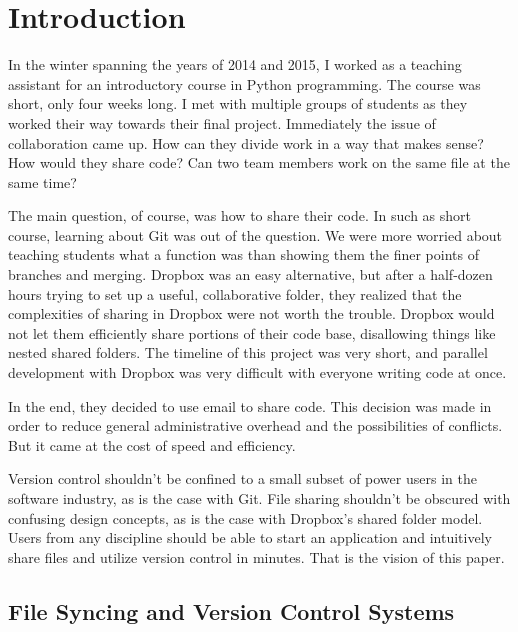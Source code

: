 \chapter{Introduction}

In the winter spanning the years of 2014 and 2015, I worked as a teaching assistant for an introductory course in Python programming. The course was short, only four weeks long. I met with multiple groups of students as they worked their way towards their final project. Immediately the issue of collaboration came up. How can they divide work in a way that makes sense? How would they share code? Can two team members work on the same file at the same time?

The main question, of course, was how to share their code. In such as short course, learning about Git was out of the question. We were more worried about teaching students what a function was than showing them the finer points of branches and merging. Dropbox was an easy alternative, but after a half-dozen hours trying to set up a useful, collaborative folder, they realized that the complexities of sharing in Dropbox were not worth the trouble. Dropbox would not let them efficiently share portions of their code base, disallowing things like nested shared folders. The timeline of this project was very short, and parallel development with Dropbox was very difficult with everyone writing code at once. 

In the end, they decided to use email to share code. This decision was made in order to reduce general administrative overhead and the possibilities of conflicts. But it came at the cost of speed and efficiency.

Version control shouldn't be confined to a small subset of power users in the software industry, as is the case with Git. File sharing shouldn't be obscured with confusing design concepts, as is the case with Dropbox's shared folder model. Users from any discipline should be able to start an application and intuitively share files and utilize version control in minutes. That is the vision of this paper.

\section{File Syncing and Version Control Systems}

